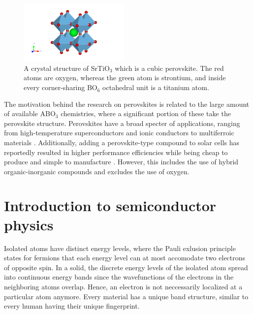 \begin{figure}
  \centering
  \includegraphics[width=0.48\textwidth]{theory/figures/SrTiO3_mp-5229_primitive.pdf}
  \caption{A crystal structure of SrTiO$_3$ which is a cubic perovskite. The red atoms are oxygen, whereas the green atom is strontium, and inside every corner-sharing BO$_6$ octahedral unit is a titanium atom.}
  \label{fig:perovskite}
\end{figure}

The motivation behind the research on perovskites is related to the large amount of available ABO$_3$ chemistries, where a significant portion of these take the perovskite structure. Perovskites have a broad specter of applications, ranging from high-temperature superconductors \cite{Bednorz1988} and ionic conductors \cite{Boivin1998} to multiferroic materials \cite{Cheong2007}. Additionally, adding a perovskite-type compound to solar cells has reportedly resulted in higher performance efficiencies while being cheap to produce and simple to manufacture \cite{IbnMohammed2017, Chen2014}. However, this includes the use of hybrid organic-inorganic compounds and excludes the use of oxygen.




\section{Introduction to semiconductor physics}

Isolated atoms have distinct energy levels, where the Pauli exlusion principle \cite{Pauli1925} states for fermions that each energy level can at most accomodate two electrons of opposite spin. In a solid, the discrete energy levels of the isolated atom spread into continuous energy bands since the wavefunctions of the electrons in the neighboring atoms overlap. Hence, an electron is not neccessarily localized at a particular atom anymore. Every material has a unique band structure, similar to every human having their unique fingerprint.

